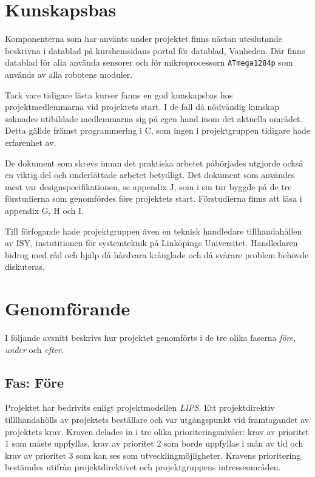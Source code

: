 \documentclass[11pt]{article}
\begin{document}
\begin{flushleft}
\pagebreak

\section{Kunskapsbas}
Komponenterna som har använts under projektet finns nästan uteslutande beskrivna i datablad på kurshemsidans portal för datablad, Vanheden\cite{hemsidan}. Där finns datablad för alla använda sensorer och för mikroprocessorn \verb+ATmega1284p+ som används av alla robotens moduler.

Tack vare tidigare lästa kurser fanns en god kunskapsbas hos projektmedlemmarna vid projektets start. I de fall då nödvändig kunskap saknades utibildade medlemmarna sig på egen hand inom det aktuella området. Detta gällde främst programmering i C, som ingen i projektgruppen tidigare hade erfarenhet av. 

De dokument som skrevs innan det praktiska arbetet påbörjades utgjorde också en viktig del och underlättade arbetet betydligt. Det dokument som användes mest var designspecifikationen, se appendix J, som i sin tur byggde på de tre förstudierna som genomfördes före projektets start. Förstudierna finns att läsa i appendix G, H och I.

Till förfogande hade projektgruppen även en teknisk handledare tillhandahållen av ISY, instutitionen för systemteknik på Linköpings Universitet. Handledaren bidrog med råd och hjälp då hårdvara krånglade och då svårare problem behövde diskuteras.

\pagebreak

\section{Genomförande}
I följande avsnitt beskrivs hur projektet genomförts i de tre olika faserna \textit{före}, \textit{under} och \textit{efter}.

\subsection{Fas: Före}
Projektet har bedrivits enligt projektmodellen \textit{LIPS}. \cite{LIPS} Ett projektdirektiv tilllhandahölls av projektets beställare och var utgångspunkt vid framtagandet av projektets krav. Kraven delades in i tre olika prioriteringsnivåer: krav av prioritet 1 som måste uppfyllas, krav av prioritet 2 som borde uppfyllas i mån av tid och krav av prioritet 3 som kan ses som utvecklingmöjligheter. Kravens prioritering bestämdes utifrån projektdirektivet och projektgruppens intresseområden. 


\end{flushleft}
\end{document}
